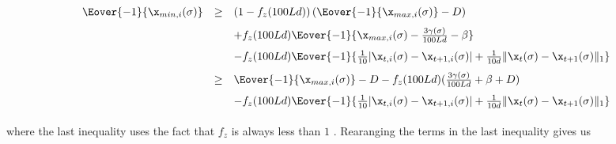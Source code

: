 \begin{equation*}
    \begin{array}{lll}
         \Eover{-1}{\x_{min,i}(\sigma)} &\geq&   \left(1-f_z(100Ld)\right)(\Eover{-1}{\x_{max, i}(\sigma)}-D)\vspace{0.1in}\\
         && + f_z(100Ld)\Eover{-1}{\x_{max,i}(\sigma) - \frac{3\gamma(\sigma)}{100Ld} - \beta}\vspace{0.1in}\\
         && - f_z(100Ld)\Eover{-1}{\frac{1}{10}|\x_{t,i}(\sigma) - \x_{t+1,i}(\sigma)|+\frac{1}{10d}\|\x_{t}(\sigma) - \x_{t+1}(\sigma)\|_1}\vspace{0.1in}\\


         & \geq & \Eover{-1}{\x_{max, i}(\sigma)} - D - f_z(100Ld)( \frac{3\gamma(\sigma)}{100Ld} + \beta + D)\vspace{0.1in}\\
         && - f_z(100Ld)\Eover{-1}{\frac{1}{10}|\x_{t,i}(\sigma) - \x_{t+1,i}(\sigma)|+\frac{1}{10d}\|\x_{t}(\sigma) - \x_{t+1}(\sigma)\|_1}\vspace{0.1in}\\


    \end{array}
\end{equation*}
where the last inequality uses the fact that $f_z$ is always less than $1$ . Rearanging the terms in the last inequality gives us 
